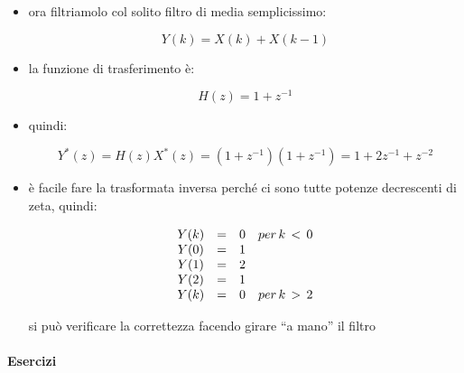 \begin{itemize}
\begin{itemize}
 \item ora filtriamolo col solito filtro di media semplicissimo:
 
		 		\begin{equation}
        	 Y(k) = X(k) + X(k-1)
		    \end{equation}
 
 \item la funzione di trasferimento \`e:
 
		 \begin{equation}
						 H(z) = 1 + z^{-1}
		 \end{equation}
 
 \item quindi:
 
		 \begin{equation}
						 Y^{*}(z) = H(z)X^{*}(z) = (1+z^{-1})(1+z^{-1}) = 1 + 2 z^{-1} + z^{-2}
		 \end{equation}

 \item \`e facile fare la trasformata inversa perch\'e ci sono tutte potenze decrescenti
       di zeta, quindi:
 
			 	\begin{equation}
								\begin{array}{c c c l}
           Y(k) & = & 0 & per\,k\,<\,0 \\
           Y(0) & = & 1 & \\
           Y(1) & = & 2 & \\
           Y(2) & = & 1 & \\
           Y(k) & = & 0 & per\,k\,>\,2\\
								\end{array}
		 \end{equation}
 
       si pu\`o verificare la correttezza facendo girare ``a mano'' il filtro

			\end{itemize}
%
%

\end{itemize}

\paragraph{Esercizi}

